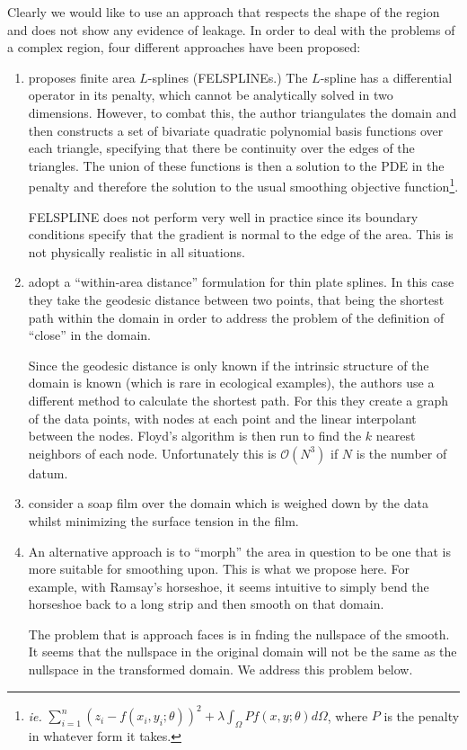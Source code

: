 \documentclass[a4paper,10pt]{amsart}
\begin{document}
Clearly we would like to use an approach that respects the shape of the region and does not show any evidence of leakage. In order to deal with the problems of a complex region, four different approaches have been proposed:

\begin{enumerate}
\item \cite{ramsay} proposes finite area $L$-splines (FELSPLINEs.) The $L$-spline has a differential operator in its penalty, which cannot be analytically solved in two dimensions. However, to combat this, the author triangulates the domain and then constructs a set of bivariate quadratic polynomial basis functions over each triangle, specifying that there be continuity over the edges of the triangles. The union of these functions is then a solution to the PDE in the penalty and therefore the solution to the usual smoothing objective function\footnote{\emph{ie.} $\sum_{i=1}^n (z_i-f(x_i,y_i;\theta))^2 + \lambda \int_\Omega Pf(x,y;\theta)d\Omega$, where $P$  is the penalty in whatever form it takes.}.

FELSPLINE does not perform very well in practice since its boundary conditions specify that the gradient is normal to the edge of the area. This is not physically realistic in all situations.

\item \cite{wangranalli} adopt a ``within-area distance'' formulation for thin plate splines. In this case they take the geodesic distance between two points, that being the shortest path within the domain in order to address the problem of the definition of ``close'' in the domain. 

Since the geodesic distance is only known if the intrinsic structure of the domain is known (which is rare in ecological examples), the authors use a different method to calculate the shortest path. For this they create a graph of the data points, with nodes at each point and the linear interpolant between the nodes. Floyd's algorithm is then run to find the $k$ nearest neighbors of each node. Unfortunately this is $\mathcal{O}(N^3)$ if $N$ is the number of datum.


\item \cite{soap} consider a soap film over the domain which is weighed down by the data whilst minimizing the surface tension in the film.

\item An alternative approach is to ``morph'' the area in question to be one that is more suitable for smoothing upon. This is what we propose here. For example, with Ramsay's horseshoe, it seems intuitive to simply bend the horseshoe back to a long strip and then smooth on that domain.

The problem that is approach faces is in fnding the nullspace of the smooth. It seems that the nullspace in the original domain will not be the same as the nullspace in the transformed domain. We address this problem below.


\end{enumerate}
\end{document}
